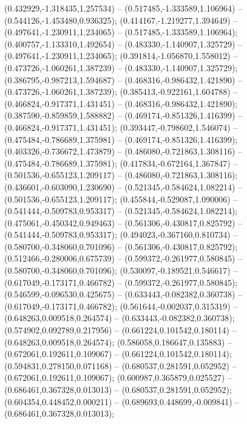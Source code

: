  (0.432929,-1.318435,1.257534) -- (0.517485,-1.333589,1.106964) -- (0.544126,-1.453480,0.936325);
 (0.414167,-1.219277,1.394649) -- (0.497641,-1.230911,1.234065) -- (0.517485,-1.333589,1.106964);
 (0.400757,-1.133310,1.492654) -- (0.483330,-1.140907,1.325729) -- (0.497641,-1.230911,1.234065);
 (0.391814,-1.056870,1.558012) -- (0.473726,-1.060261,1.387239) -- (0.483330,-1.140907,1.325729);
 (0.386795,-0.987213,1.594687) -- (0.468316,-0.986432,1.421890) -- (0.473726,-1.060261,1.387239);
 (0.385413,-0.922161,1.604788) -- (0.466824,-0.917371,1.431451) -- (0.468316,-0.986432,1.421890);
 (0.387590,-0.859859,1.588882) -- (0.469174,-0.851326,1.416399) -- (0.466824,-0.917371,1.431451);
 (0.393447,-0.798602,1.546074) -- (0.475484,-0.786689,1.375981) -- (0.469174,-0.851326,1.416399);
 (0.403326,-0.736672,1.473879) -- (0.486080,-0.721863,1.308116) -- (0.475484,-0.786689,1.375981);
 (0.417834,-0.672164,1.367847) -- (0.501536,-0.655123,1.209117) -- (0.486080,-0.721863,1.308116);
 (0.436601,-0.603090,1.230690) -- (0.521345,-0.584624,1.082214) -- (0.501536,-0.655123,1.209117);
 (0.455844,-0.529087,1.090006) -- (0.541444,-0.509783,0.953317) -- (0.521345,-0.584624,1.082214);
 (0.475061,-0.450342,0.949463) -- (0.561306,-0.430817,0.825792) -- (0.541444,-0.509783,0.953317);
 (0.494023,-0.367160,0.810734) -- (0.580700,-0.348060,0.701096) -- (0.561306,-0.430817,0.825792);
 (0.512466,-0.280006,0.675739) -- (0.599372,-0.261977,0.580845) -- (0.580700,-0.348060,0.701096);
 (0.530097,-0.189521,0.546617) -- (0.617049,-0.173171,0.466782) -- (0.599372,-0.261977,0.580845);
 (0.546599,-0.096530,0.425675) -- (0.633443,-0.082382,0.360738) -- (0.617049,-0.173171,0.466782);
 (0.561644,-0.002037,0.315319) -- (0.648263,0.009518,0.264574) -- (0.633443,-0.082382,0.360738);
 (0.574902,0.092789,0.217956) -- (0.661224,0.101542,0.180114) -- (0.648263,0.009518,0.264574);
 (0.586058,0.186647,0.135883) -- (0.672061,0.192611,0.109067) -- (0.661224,0.101542,0.180114);
 (0.594831,0.278150,0.071168) -- (0.680537,0.281591,0.052952) -- (0.672061,0.192611,0.109067);
 (0.600987,0.365879,0.025527) -- (0.686461,0.367328,0.013013) -- (0.680537,0.281591,0.052952);
 (0.604354,0.448452,0.000211) -- (0.689693,0.448699,-0.009841) -- (0.686461,0.367328,0.013013);
